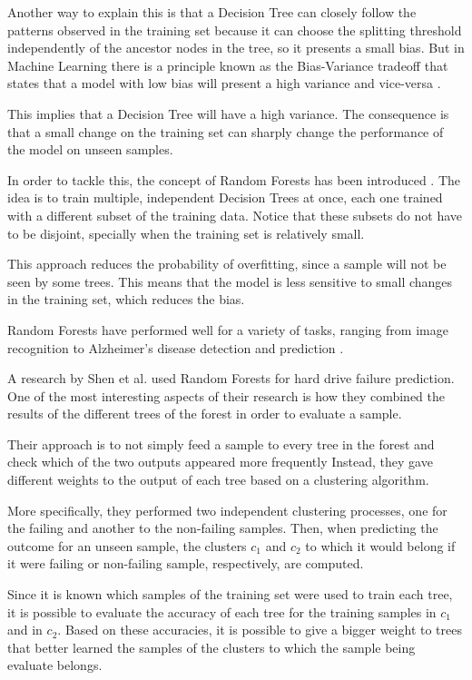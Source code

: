 Another way to explain this is that a Decision Tree can closely follow the patterns observed in the training set because it can choose the splitting threshold independently of the ancestor nodes in the tree, so it presents a small bias.
But in Machine Learning there is a principle known as the Bias-Variance tradeoff that states that a model with low bias will present a high variance and vice-versa \cite{briscoe2011conceptual}.

This implies that a Decision Tree will have a high variance.
The consequence is that a small change on the training set can sharply change the performance of the model on unseen samples.

In order to tackle this, the concept of Random Forests has been introduced \cite{ho1995random}.
The idea is to train multiple, independent Decision Trees at once, each one trained with a different subset of the training data.
Notice that these subsets do not have to be disjoint, specially when the training set is relatively small.

This approach reduces the probability of overfitting, since a sample will not be seen by some trees.
This means that the model is less sensitive to small changes in the training set, which reduces the bias.

Random Forests have performed well for a variety of tasks, ranging from image recognition to Alzheimer's disease detection and prediction \cite{shaik2019brief}.

A research by Shen et al. \cite{Shen18} used Random Forests for hard drive failure prediction.
One of the most interesting aspects of their research is how they combined the results of the different trees of the forest in order to evaluate a sample.

Their approach is to not simply feed a sample to every tree in the forest and check which of the two outputs appeared more frequently
Instead, they gave different weights to the output of each tree based on a clustering algorithm.

More specifically, they performed two independent clustering processes, one for the failing and another to the non-failing samples.
Then, when predicting the outcome for an unseen sample, the clusters $c_1$ and $c_2$ to which it would belong if it were failing or non-failing sample, respectively, are computed.

Since it is known which samples of the training set were used to train each tree, it is possible to evaluate the accuracy of each tree for the training samples in $c_1$ and in $c_2$.
Based on these accuracies, it is possible to give a bigger weight to trees that better learned the samples of the clusters to which the sample being evaluate belongs.

